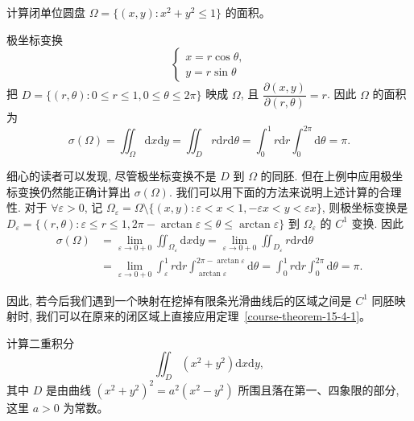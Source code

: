 \documentclass[12pt,fontset=fandol]{ctexart}
\begin{document}
\begin{example}\label{course-example-15-4-1}\quad 计算闭单位圆盘 $\Omega=\{(x,y):x^2+y^2\leqslant1\}$ 的面积。

\end{example}
\begin{solve}\quad 极坐标变换
\[
  \begin{cases}
    x=r\cos\theta,\\
    y=r\sin\theta
  \end{cases}
\]
把 $D=\{(r,\theta):0\leqslant r\leqslant1,0\leqslant\theta\leqslant2\pi\}$ 映成 $\Omega$, 且 $\dfrac{\partial(x,y)}{\partial(r,\theta)}=r$. 因此 $\Omega$ 的面积为
\[
  \sigma(\Omega)=\iint_\Omega\mathrm dx\mathrm dy
  =\iint_D r\mathrm dr\mathrm d\theta
  =\int_0^1 r\mathrm dr\int_0^{2\pi}\mathrm d\theta=\pi.
\]

细心的读者可以发现, 尽管极坐标变换不是 $D$ 到 $\Omega$ 的同胚. 但在上例中应用极坐标变换仍然能正确计算出 $\sigma(\Omega)$. 我们可以用下面的方法来说明上述计算的合理性. 对于 $\forall\varepsilon>0$, 记 $\Omega_\varepsilon=\Omega\setminus\{(x,y):\varepsilon<x<1,-\varepsilon x<y<\varepsilon x\}$, 则极坐标变换是 $D_\varepsilon=\{(r,\theta):\varepsilon\leqslant r\leqslant1,2\pi-\arctan\varepsilon\leqslant\theta\leqslant\arctan\varepsilon\}$ 到 $\Omega_\varepsilon$ 的 $C^1$ 变换. 因此
\[
\begin{aligned}
  \sigma(\Omega)
  &=\lim_{\varepsilon\to0+0}\iint_{\Omega_\varepsilon}\mathrm dx\mathrm dy
  =\lim_{\varepsilon\to0+0}\iint_{D_\varepsilon}r\mathrm dr\mathrm d\theta\\
  &=\lim_{\varepsilon\to0+0}\int_\varepsilon^1 r\mathrm dr
  \int_{\arctan\varepsilon}^{2\pi-\arctan\varepsilon}\mathrm d\theta
  =\int_0^1 r\mathrm dr\int_0^{2\pi}\mathrm d\theta=\pi.
\end{aligned}
\]

因此, 若今后我们遇到一个映射在挖掉有限条光滑曲线后的区域之间是 $C^1$ 同胚映射时, 我们可以在原来的闭区域上直接应用定理~\ref{course-theorem-15-4-1}。

\end{solve}
\begin{example}\label{course-example-15-4-2}\quad 计算二重积分
\[
  \iint_D(x^2+y^2)\mathrm dx\mathrm dy,
\]
其中 $D$ 是由曲线 $(x^2+y^2)^2=a^2(x^2-y^2)$ 所围且落在第一、四象限的部分, 这里 $a>0$ 为常数。

\end{example}
\end{document}
